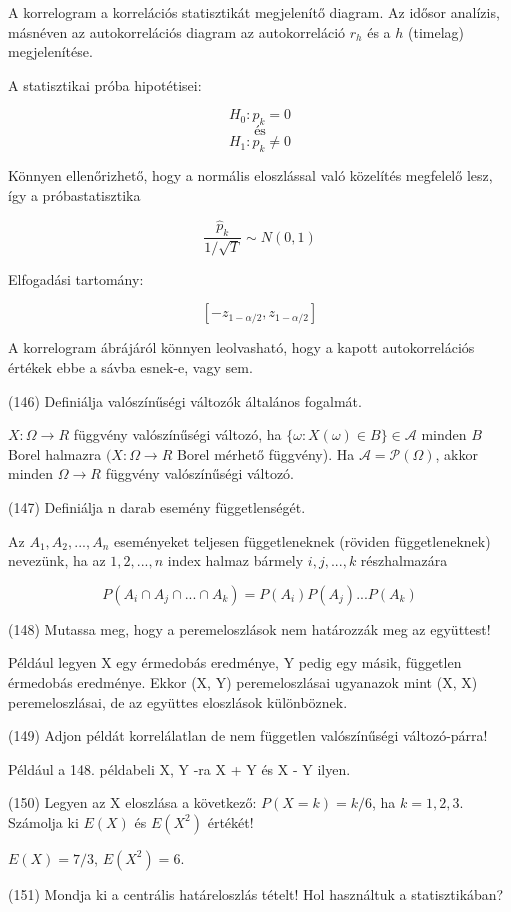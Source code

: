 \documentclass[12p]{article}
\begin{document}
A korrelogram a korrelációs statisztikát megjelenítő diagram. Az idősor analízis, másnéven az autokorrelációs diagram az autokorreláció $r_h$ és a $h$ (timelag) megjelenítése.

A statisztikai próba hipotétisei:

$$H_0 : p_k = 0$$
\[
	\text{és}
\]
$$H_1 : p_k \neq 0$$

Könnyen ellenőrizhető, hogy a normális eloszlással való közelítés megfelelő
lesz, így a próbastatisztika

$$\frac{\hat{p}_k}{1/\sqrt{T}} \sim N(0,1) $$

Elfogadási tartomány:

$$[-z_{1-\alpha/2},z_{1-\alpha/2}]$$

A korrelogram ábrájáról könnyen leolvasható, hogy a kapott autokorrelációs
értékek ebbe a sávba esnek-e, vagy sem.

(146) Definiálja valószínűségi változók általános fogalmát.

$X : \Omega \rightarrow R$ függvény valószínűségi változó, ha $\{\omega: X(\omega) \in B\} \in \mathscr{A}$ minden $B$ Borel halmazra $(X: \Omega \rightarrow R$ Borel mérhető függvény).
Ha $\mathscr{A} = \mathscr{P}(\Omega)$, akkor minden $\Omega \rightarrow R$ függvény valószínűségi változó.


(147) Definiálja n darab esemény függetlenségét.

Az $A_1,A_2, ..., A_n$ eseményeket teljesen függetleneknek (röviden függetleneknek) nevezünk, ha az ${1, 2, ..., n}$ index halmaz bármely ${i, j, ..., k}$ részhalmazára

$$P(A_i \cap A_j \cap ... \cap A_k) = P(A_i)P(A_j)...P(A_k)$$

(148) Mutassa meg, hogy a peremeloszlások nem határozzák meg az együttest!

Például legyen X egy érmedobás eredménye, Y pedig egy másik, független érmedobás eredménye. Ekkor (X, Y) peremeloszlásai ugyanazok mint (X, X) peremeloszlásai, de az együttes eloszlások különböznek.

(149) Adjon példát korrelálatlan de nem független valószínűségi változó-párra!

Például a 148. példabeli X, Y -ra X + Y és X - Y ilyen.

(150) Legyen az X eloszlása a következő: $P(X = k) = k/6$, ha $k = 1, 2, 3$. Számolja ki $E(X)$ és $E(X^2)$ értékét!

$E(X) = 7/3$, $E(X^2) = 6$.

(151) Mondja ki a centrális határeloszlás tételt! Hol használtuk a statisztikában?
\end{document}
